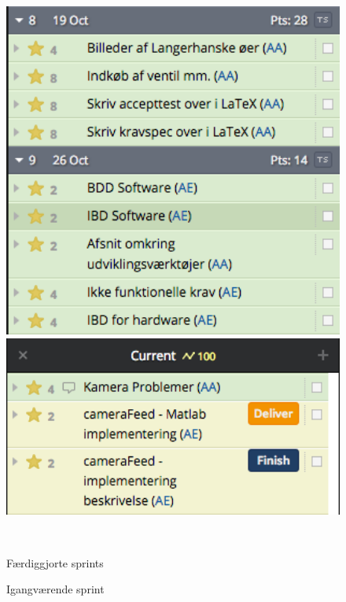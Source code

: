 \begin{figure}[htbp] \centering
\begin{minipage}[b]{0.48\textwidth} \centering
\includegraphics[width=1.00\textwidth]{billeder/pt_previous_sprints} %
\end{minipage} \hfill
\begin{minipage}[b]{0.48\textwidth} \centering
\includegraphics[width=1.00\textwidth]{billeder/pt_current_sprint} %
\end{minipage} \\ %
\begin{minipage}[t]{0.48\textwidth}
\caption{Færdiggjorte sprints} %
\label{fig:pt_sprints}
\end{minipage} \hfill
\begin{minipage}[t]{0.48\textwidth}
\caption{Igangværende sprint} %
\label{fig:pt_currentsprint}
\end{minipage}
\end{figure}

